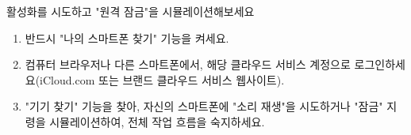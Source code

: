 \begin{tcbpractice}{활성화를 시도하고 "원격 잠금"을 시뮬레이션해보세요}
\begin{enumerate}
  \item 반드시 "나의 스마트폰 찾기" 기능을 켜세요.
  \item 컴퓨터 브라우저나 다른 스마트폰에서, 해당 클라우드 서비스 계정으로 로그인하세요(iCloud.com 또는 브랜드 클라우드 서비스 웹사이트).
  \item "기기 찾기" 기능을 찾아, 자신의 스마트폰에 "소리 재생"을 시도하거나 "잠금" 지령을 시뮬레이션하여, 전체 작업 흐름을 숙지하세요.
\end{enumerate}

\end{tcbpractice}
